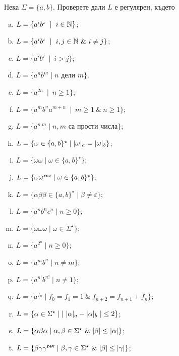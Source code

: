 {\begin{problem}
  Нека $\Sigma = \{a,b\}$.  Проверете дали $L$ е регулярен, където
  \begin{multicols}{2}
  \begin{enumerate}[a)]
  \item
    $L = \{a^ib^i\ \mid\ i\in\Nat\}$;
  \item
    $L = \{a^ib^i\ \mid\ i,j\in\Nat\ \&\ i\neq j\}$;
  \item
    $L = \{a^ib^j\ \mid\ i > j\}$;
  \item
    $L = \{a^nb^m \mid n\text{ дели }m\}$.
  \item
    $L = \{a^{2n}\ \mid\ n\geq 1\}$;
  \item
    $L = \{a^mb^na^{m+n}\ \mid\ m\geq 1\ \&\ n\geq 1\}$;
  \item
    $L = \{a^{n.m}\mid n,m\text{ са прости числа}\}$;
  \item
    $L = \{\omega\in\{a,b\}^\star \mid \vert{\omega}\vert_{a} = \vert{\omega}\vert_{b}\}$;
  \item
    $L = \{\omega\omega\mid \omega\in\{a,b\}^\star\}$;
  \item
    $L = \{\omega\omega^{\texttt{rev}}\mid \omega\in\{a,b\}^\star\}$;
  \item
    $L = \{\alpha\beta\beta \in \{a,b\}^\star\mid \beta \neq \varepsilon\}$;
  \item
    $L = \{a^nb^nc^n\mid n\geq 0\}$;
  \item
    $L = \{\omega\omega\omega\mid \omega\in \Sigma^\star\}$;
  \item
    $L = \{a^{2^n}\mid n\geq 0\}$;
  \item
    $L = \{a^mb^n\mid n\neq m\}$;
  \item
    $L = \{a^{n!}b^{n!}\mid n\neq 1\}$;
  \item
    $L = \{a^{f_n} \mid f_0 = f_1 = 1\ \&\ f_{n+2} = f_{n+1} + f_{n}\}$;
  \item
    $L = \{\alpha \in \Sigma^\star \mid \vert{\ \vert{\alpha}\vert_{a} - \vert{\alpha}\vert_{b}\ }\vert \leq 2\}$;
  \item
    $L = \{\alpha\beta\alpha \mid \alpha,\beta \in \Sigma^\star\ \&\ \vert{\beta}\vert \leq \vert{\alpha}\vert\}$;
  \item
    $L = \{\beta\gamma\gamma^{\texttt{rev}}\mid \beta, \gamma \in \Sigma^\star\ \&\ \vert{\beta}\vert \leq \vert{\gamma}\vert\}$;

\end{enumerate}
\end{multicols}
\end{problem}}
